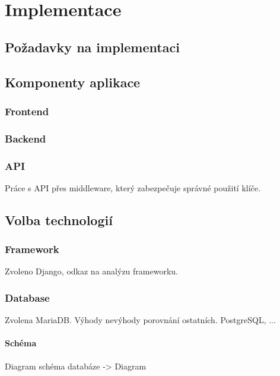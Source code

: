 \chapter{Implementace}
\label{ch:implementation}

\section{Požadavky na implementaci}
\label{sec:implementation-requirements}

\section{Komponenty aplikace}
\label{sec:implementation-components}

\subsection{Frontend}
\label{subsec:implementation-frontend}

\subsection{Backend}
\label{subsec:implementation-backend}

\subsection{API}
\label{subsec:implementation-api}
Práce s API přes middleware, který zabezpečuje správné použití klíče.

\section{Volba technologií}
\label{sec:implementation-technologies}

\subsection{Framework}
\label{subsec:implementation-technologies-framework}
Zvoleno Django, odkaz na analýzu frameworku.

\subsection{Database}
\label{subsec:implementation-technologies-database}
Zvolena MariaDB. Výhody nevýhody porovnání ostatních. PostgreSQL, ...

\subsubsection*{Schéma}
\label{subsubsec:implementation-technologies-database-scheme}
Diagram schéma databáze -> Diagram

